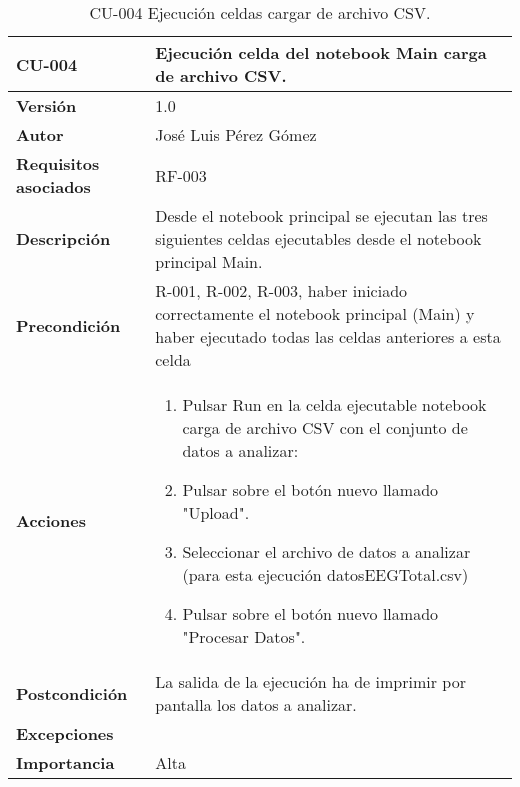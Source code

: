 \begin{table}[p]
	\centering
	\begin{tabularx}{\linewidth}{ p{} p{} }
		\toprule
		\textbf{CU-004}    & \textbf{Ejecución celda del notebook Main carga de archivo CSV.}\\
		\toprule
		\textbf{Versión}              & 1.0    \\
		\textbf{Autor}                & José Luis Pérez Gómez \\
		\textbf{Requisitos asociados} & RF-003 \\
		\textbf{Descripción}          & Desde el notebook principal se ejecutan las tres siguientes celdas ejecutables desde el notebook principal Main. \\
		\textbf{Precondición}         & R-001, R-002, R-003, haber iniciado correctamente el notebook principal (Main) y haber ejecutado todas las celdas anteriores a esta celda\\
		\textbf{Acciones}             &
		\begin{enumerate}
			\def\labelenumi{\arabic{enumi}.}
			\tightlist
			\item Pulsar Run en la celda ejecutable notebook carga de archivo CSV con el conjunto de datos a analizar:
			\item Pulsar sobre el botón nuevo llamado "Upload".
			\item Seleccionar el archivo de datos a analizar (para esta ejecución datosEEGTotal.csv)
			\item Pulsar sobre el botón nuevo llamado "Procesar Datos".
		\end{enumerate}\\
		\textbf{Postcondición}        & La salida de la ejecución ha de imprimir por pantalla los datos a analizar.\\
		\textbf{Excepciones}          &  \\
		\textbf{Importancia}          & Alta \\
		\bottomrule
	\end{tabularx}
	\caption{CU-004 Ejecución celdas cargar de archivo CSV.}
\end{table}

